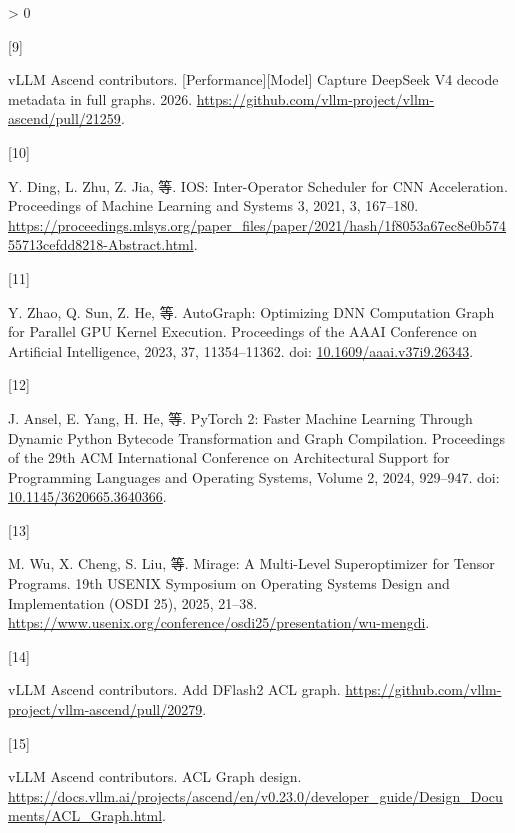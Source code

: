 \documentclass[
  UTF8,
  zihao=5]{ctexart}
\newlength{\cslhangindent}
\newlength{\csllabelwidth}
\newenvironment{CSLReferences}[2] %
 {%
  \setlength{\parindent}{0pt}
  \ifodd #1 \everypar{\setlength{\hangindent}{\cslhangindent}}\ignorespaces\fi
  \ifnum #2 > 0
  \setlength{\parskip}{#2\baselineskip}
  \fi
 }%
 {}
\newcommand{\CSLLeftMargin}[1]{\parbox[t]{\csllabelwidth}{#1}}
\newcommand{\CSLRightInline}[1]{\parbox[t]{\linewidth - \csllabelwidth}{#1}\par}
\begin{document}
\begin{CSLReferences}{0}{0}
\leavevmode{}%
\CSLLeftMargin{{[}9{]} }%
\CSLRightInline{vLLM Ascend contributors. {{[}Performance{]}{[}Model{]}
Capture DeepSeek V4 decode metadata in full graphs}. 2026.
\url{https://github.com/vllm-project/vllm-ascend/pull/21259}.}

\leavevmode{}%
\CSLLeftMargin{{[}10{]} }%
\CSLRightInline{Y. Ding, L. Zhu, Z. Jia, 等. IOS: Inter-Operator
Scheduler for CNN Acceleration. Proceedings of Machine Learning and
Systems 3, 2021, 3, 167--180.
\url{https://proceedings.mlsys.org/paper_files/paper/2021/hash/1f8053a67ec8e0b57455713cefdd8218-Abstract.html}.}

\leavevmode{}%
\CSLLeftMargin{{[}11{]} }%
\CSLRightInline{Y. Zhao, Q. Sun, Z. He, 等. AutoGraph: Optimizing DNN
Computation Graph for Parallel GPU Kernel Execution. Proceedings of the
AAAI Conference on Artificial Intelligence, 2023, 37, 11354--11362. doi:
\href{https://doi.org/10.1609/aaai.v37i9.26343}{10.1609/aaai.v37i9.26343}.}

\leavevmode{}%
\CSLLeftMargin{{[}12{]} }%
\CSLRightInline{J. Ansel, E. Yang, H. He, 等. PyTorch 2: Faster Machine
Learning Through Dynamic Python Bytecode Transformation and Graph
Compilation. Proceedings of the 29th ACM International Conference on
Architectural Support for Programming Languages and Operating Systems,
Volume 2, 2024, 929--947. doi:
\href{https://doi.org/10.1145/3620665.3640366}{10.1145/3620665.3640366}.}

\leavevmode{}%
\CSLLeftMargin{{[}13{]} }%
\CSLRightInline{M. Wu, X. Cheng, S. Liu, 等. Mirage: A Multi-Level
Superoptimizer for Tensor Programs. 19th USENIX Symposium on Operating
Systems Design and Implementation (OSDI 25), 2025, 21--38.
\url{https://www.usenix.org/conference/osdi25/presentation/wu-mengdi}.}

\leavevmode{}%
\CSLLeftMargin{{[}14{]} }%
\CSLRightInline{vLLM Ascend contributors. {Add DFlash2 ACL graph}.
\url{https://github.com/vllm-project/vllm-ascend/pull/20279}.}

\leavevmode{}%
\CSLLeftMargin{{[}15{]} }%
\CSLRightInline{vLLM Ascend contributors. {ACL Graph design}.
\url{https://docs.vllm.ai/projects/ascend/en/v0.23.0/developer_guide/Design_Documents/ACL_Graph.html}.}


\end{CSLReferences}
\end{document}
